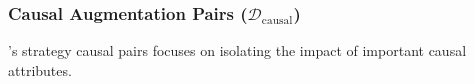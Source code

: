 


\subsubsection{Causal Augmentation Pairs (\texorpdfstring{$\mathcal{D}_{\mathrm{causal}}$}{D-causal})}
\carma{}'s strategy causal pairs focuses on isolating the impact of important causal attributes.

\vspace{-0.05in}

